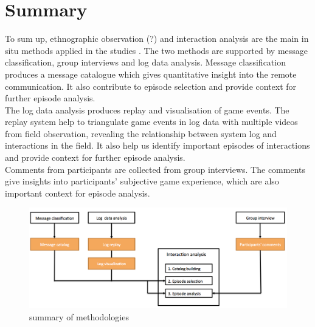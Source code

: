 \section{Summary}
To sum up, ethnographic observation (?) and interaction analysis are the main in situ methods applied in the studies . The two methods are supported by message classification, group interviews and log data analysis. Message classification produces a message catalogue which gives quantitative insight into the remote communication. It also contribute to episode selection and provide context for further episode analysis. \\

The log data analysis produces replay and visualisation of game events. The replay system help to triangulate game events in log data with multiple videos from field observation, revealing the relationship between system log and interactions in the field. It also help us identify important episodes of interactions and  provide context for further episode analysis.\\

Comments from participants are collected from group interviews. The comments give insights into participants' subjective game experience, which are also important context for episode analysis.\\

\begin{figure}[h]
  \centering
  \includegraphics[width=1\textwidth]{img/methodology/summary}
  \caption{summary of methodologies}
  \label{fig:summary}
\end{figure}


